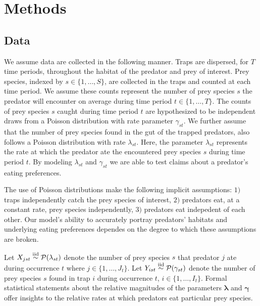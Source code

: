 \section{Methods}
\label{sec:methods}

\subsection{Data}

We assume data are collected in the following manner.  Traps are dispersed, for $T$ time periods, throughout the habitat of the predator and prey of interest.  Prey species, indexed by $s \in \{1, \ldots, S \}$, are collected in the traps and counted at each time period.  We assume these counts represent the number of prey species $s$ the predator will encounter on average during time period $t \in \{1, \ldots, T\}$.  The counts of prey species $s$ caught during time period $t$ are hypothesized to be independent draws from a Poisson distribution with rate parameter $\gamma_{st}$.  We further assume that the number of prey species found in the gut of the trapped predators, also follows a Poisson distribution with rate $\lambda_{st}$.  Here, the parameter $\lambda_{st}$ represents the rate at which the predator ate the encountered prey species $s$ during time period $t$.  By modeling $\lambda_{st}$ and $\gamma_{st}$ we are able to test claims about a predator's eating preferences.  

The use of Poisson distributions make the following implicit assumptions: $1)$ traps independently catch the prey species of interest, $2)$ predators eat, at a constant rate, prey species independently, $3)$ predators eat indepedent of each other.  Our model's ability to accurately portray predators' habitats and underlying eating preferences dependes on the degree to which these assumptions are broken.

Let $X_{jst} \stackrel{\mathrm{iid}}{\sim} \mathcal{P}(\lambda_{st})$ denote the number of prey species $s$ that predator $j$ ate during occurrence $t$ where $j \in \{1, \ldots, J_t\}$.  Let $Y_{ist} \stackrel{\mathrm{iid}}{\sim} \mathcal{P}(\gamma_{st})$ denote the number of prey species $s$ found in trap $i$ during occurrence $t$, $i \in \{1, \ldots, I_t\}$.  Formal statistical statements about the relative magnitudes of the parameters $\boldsymbol{\lambda}$ and $\boldsymbol{\gamma}$ offer insights to the relative rates at which predators eat particular prey species.  


